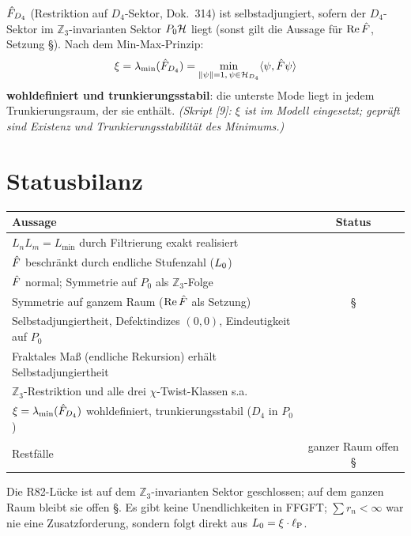 \begin{tcolorbox}[proofbox, title={Korollar 7 — $\xi$ als wohldefiniertes Minimum \B}]
  $\hat{F}_{D_4}$ (Restriktion auf $D_4$-Sektor, Dok.~314) ist selbstadjungiert,
  sofern der $D_4$-Sektor im $\mathbb{Z}_3$-invarianten Sektor $P_0\mathcal{H}$ liegt
  (sonst gilt die Aussage für $\mathrm{Re}\,\hat{F}$, Setzung \S).
  Nach dem Min-Max-Prinzip:
  \[
    \xi = \lambda_{\min}(\hat{F}_{D_4})
        = \min_{\|\psi\|=1,\,\psi\in\mathcal{H}_{D_4}} \langle\psi, \hat{F}\psi\rangle
  \]
  \textbf{wohldefiniert und trunkierungsstabil}: die unterste Mode liegt
  in jedem Trunkierungsraum, der sie enthält.
  \emph{(Skript [9]: $\xi$ ist im Modell eingesetzt; geprüft sind Existenz und Trunkierungsstabilität des Minimums.)}
\end{tcolorbox}

\section{Statusbilanz}

\begin{center}
\begin{tabular}{@{}lc@{}}
  \toprule
  \textbf{Aussage} & \textbf{Status} \\
  \midrule
  $L_nL_m = L_{\min}$ durch Filtrierung exakt realisiert & \B \\
  $\hat{F}$ beschränkt durch endliche Stufenzahl ($L_0$) & \B \\
  $\hat{F}$ normal; Symmetrie auf $P_0$ als $\mathbb{Z}_3$-Folge & \B \\
  Symmetrie auf ganzem Raum ($\mathrm{Re}\,\hat{F}$ als Setzung) & \S \\
  Selbstadjungiertheit, Defektindizes $(0,0)$, Eindeutigkeit auf $P_0$ & \B \\
  Fraktales Maß (endliche Rekursion) erhält Selbstadjungiertheit & \B \\
  $\mathbb{Z}_3$-Restriktion und alle drei $\chi$-Twist-Klassen s.a. & \B \\
  $\xi = \lambda_{\min}(\hat{F}_{D_4})$ wohldefiniert, trunkierungsstabil ($D_4$ in $P_0$) & \B \\
  \midrule
  Restfälle & ganzer Raum offen \S \\
  \bottomrule
\end{tabular}
\end{center}

Die R82-Lücke ist auf dem $\mathbb{Z}_3$-invarianten Sektor geschlossen;
auf dem ganzen Raum bleibt sie offen \S.
Es gibt keine Unendlichkeiten in FFGFT;
$\sum r_n < \infty$ war nie eine Zusatzforderung,
sondern folgt direkt aus $L_0 = \xi\cdot\ell_{\mathrm{P}}$.

